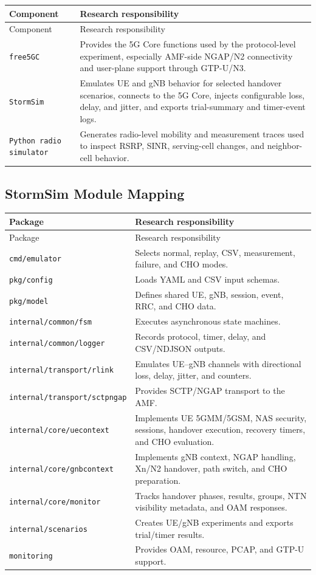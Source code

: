 \begin{longtable}{p{3.2cm}p{10.7cm}}
\toprule
Component & Research responsibility\\
\midrule
\endfirsthead
\toprule
Component & Research responsibility\\
\midrule
\endhead
\texttt{free5GC} & Provides the 5G Core functions used by the protocol-level experiment, especially AMF-side NGAP/N2 connectivity and user-plane support through GTP-U/N3.\\
\texttt{StormSim} & Emulates UE and gNB behavior for selected handover scenarios, connects to the 5G Core, injects configurable loss, delay, and jitter, and exports trial-summary and timer-event logs.\\
\texttt{Python radio simulator} & Generates radio-level mobility and measurement traces used to inspect RSRP, SINR, serving-cell changes, and neighbor-cell behavior.\\
\bottomrule
\end{longtable}

\subsection{StormSim Module Mapping}

\begin{longtable}{p{4.2cm}p{9.7cm}}
\toprule
Package & Research responsibility\\
\midrule
\endfirsthead
\toprule
Package & Research responsibility\\
\midrule
\endhead
\texttt{cmd/emulator} & Selects normal, replay, CSV, measurement, failure, and CHO modes.\\
\texttt{pkg/config} & Loads YAML and CSV input schemas.\\
\texttt{pkg/model} & Defines shared UE, gNB, session, event, RRC, and CHO data.\\
\texttt{internal/common/fsm} & Executes asynchronous state machines.\\
\texttt{internal/common/logger} & Records protocol, timer, delay, and CSV/NDJSON outputs.\\
\texttt{internal/transport/rlink} & Emulates UE--gNB channels with directional loss, delay, jitter, and counters.\\
\texttt{internal/transport/sctpngap} & Provides SCTP/NGAP transport to the AMF.\\
\texttt{internal/core/uecontext} & Implements UE 5GMM/5GSM, NAS security, sessions, handover execution, recovery timers, and CHO evaluation.\\
\texttt{internal/core/gnbcontext} & Implements gNB context, NGAP handling, Xn/N2 handover, path switch, and CHO preparation.\\
\texttt{internal/core/monitor} & Tracks handover phases, results, groups, NTN visibility metadata, and OAM responses.\\
\texttt{internal/scenarios} & Creates UE/gNB experiments and exports trial/timer results.\\
\texttt{monitoring} & Provides OAM, resource, PCAP, and GTP-U support.\\
\bottomrule
\end{longtable}

